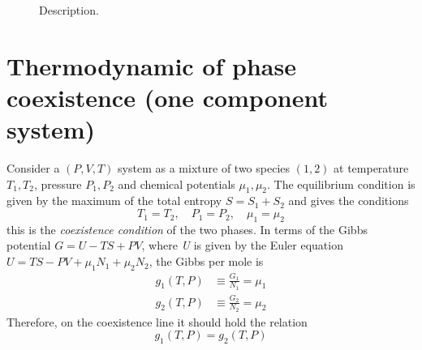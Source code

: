 \documentclass[../main/main.tex]{subfiles}
\begin{document}
\begin{figure}[h!]

\caption{\label{fig:3_0} Description.}
\end{figure}

\section{Thermodynamic of phase coexistence (one component system)}
Consider a \( (P,V,T) \) system as a mixture of two species \( (1,2) \) at temperature \( T_1, T_2 \), pressure \( P_1, P_2 \) and chemical potentials \( \mu _1,\mu _2 \). The equilibrium condition is given by the maximum of the total entropy \( S = S_1 + S_2 \) and gives the conditions
\begin{equation}
  T_1 = T_2, \quad P_1 = P_2, \quad \mu _1 = \mu _2
  \label{eq:}
\end{equation}
this is the \emph{coexistence condition} of the two phases.
In terms of the Gibbs potential \( G = U- TS+PV \), where \emph{U} is given by  the Euler equation \( U = TS-PV+ \mu _1 N_1 + \mu _2 N_2 \), the Gibbs per mole is
\begin{subequations}
\begin{align}
  g_1 (T,P) &\equiv \frac{G_1}{N_1} = \mu _1 \\
  g_2 (T,P) &\equiv \frac{G_2}{N_2} = \mu _2
\end{align}
\label{}
\end{subequations}
Therefore, on the coexistence line it should hold the relation
\begin{equation}
  g_1 (T,P) = g_2 (T,P)
  \label{eq:}
\end{equation}
\end{document}

